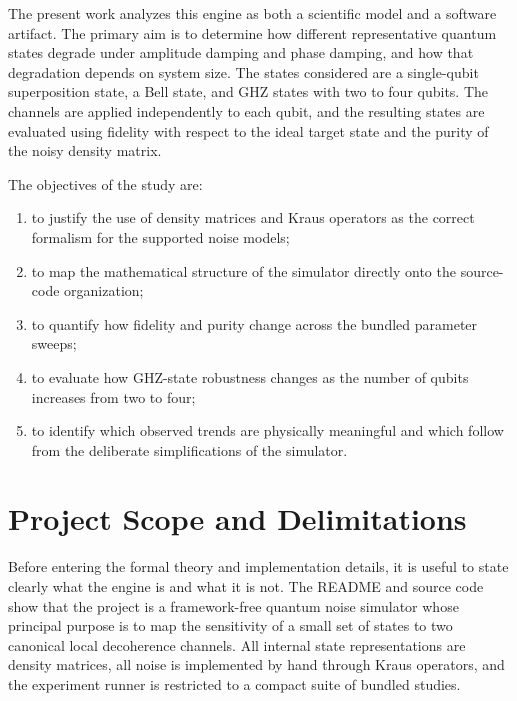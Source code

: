 The present work analyzes this engine as both a scientific model and a software artifact. The primary aim is to determine how different representative quantum states degrade under amplitude damping and phase damping, and how that degradation depends on system size. The states considered are a single-qubit superposition state, a Bell state, and GHZ states with two to four qubits. The channels are applied independently to each qubit, and the resulting states are evaluated using fidelity with respect to the ideal target state and the purity of the noisy density matrix.

The objectives of the study are:
\begin{enumerate}
\item to justify the use of density matrices and Kraus operators as the correct formalism for the supported noise models;
\item to map the mathematical structure of the simulator directly onto the source-code organization;
\item to quantify how fidelity and purity change across the bundled parameter sweeps;
\item to evaluate how GHZ-state robustness changes as the number of qubits increases from two to four;
\item to identify which observed trends are physically meaningful and which follow from the deliberate simplifications of the simulator.
\end{enumerate}

\section{Project Scope and Delimitations}

Before entering the formal theory and implementation details, it is useful to state clearly what the engine is and what it is not. The README and source code show that the project is a framework-free quantum noise simulator whose principal purpose is to map the sensitivity of a small set of states to two canonical local decoherence channels. All internal state representations are density matrices, all noise is implemented by hand through Kraus operators, and the experiment runner is restricted to a compact suite of bundled studies.

